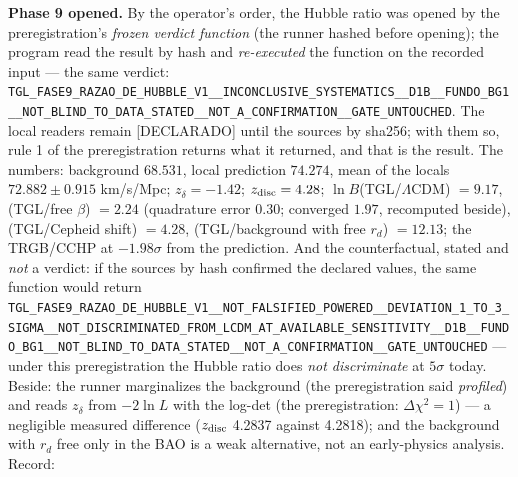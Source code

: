\documentclass[11pt]{article}
\theoremstyle{definition}\newtheorem{deriv}{Derivation}
\begin{document}
\textbf{Phase 9 opened.} By the operator's order, the Hubble ratio was opened by the preregistration's \emph{frozen verdict function} (the runner hashed before opening); the program read the result by hash and \emph{re-executed} the function on the recorded input --- the same verdict: \texttt{TGL\_\allowbreak{}FASE9\_\allowbreak{}RAZAO\_\allowbreak{}DE\_\allowbreak{}HUBBLE\_\allowbreak{}V1\_\allowbreak{}\_\allowbreak{}INCONCLUSIVE\_\allowbreak{}SYSTEMATICS\_\allowbreak{}\_\allowbreak{}D1B\_\allowbreak{}\_\allowbreak{}FUNDO\_\allowbreak{}BG1\_\allowbreak{}\_\allowbreak{}NOT\_\allowbreak{}BLIND\_\allowbreak{}TO\_\allowbreak{}DATA\_\allowbreak{}STATED\_\allowbreak{}\_\allowbreak{}NOT\_\allowbreak{}A\_\allowbreak{}CONFIRMATION\_\allowbreak{}\_\allowbreak{}GATE\_\allowbreak{}UNTOUCHED}. The local readers remain \textsf{[DECLARADO]} until the sources by sha256; with them so, rule 1 of the preregistration returns what it returned, and that is the result. The numbers: background $68.531$, local prediction $74.274$, mean of the locals $72.882\pm0.915$ km/s/Mpc; $z_\delta=-1.42$; $z_{\rm disc}=4.28$; $\ln B$(TGL/$\Lambda$CDM) $=9.17$, (TGL/free $\beta$) $=2.24$ (quadrature error $0.30$; converged $1.97$, recomputed beside), (TGL/Cepheid shift) $=4.28$, (TGL/background with free $r_d$) $=12.13$; the TRGB/CCHP at $-1.98\sigma$ from the prediction. And the counterfactual, stated and \emph{not} a verdict: if the sources by hash confirmed the declared values, the same function would return \texttt{TGL\_\allowbreak{}FASE9\_\allowbreak{}RAZAO\_\allowbreak{}DE\_\allowbreak{}HUBBLE\_\allowbreak{}V1\_\allowbreak{}\_\allowbreak{}NOT\_\allowbreak{}FALSIFIED\_\allowbreak{}POWERED\_\allowbreak{}\_\allowbreak{}DEVIATION\_\allowbreak{}1\_\allowbreak{}TO\_\allowbreak{}3\_\allowbreak{}SIGMA\_\allowbreak{}\_\allowbreak{}NOT\_\allowbreak{}DISCRIMINATED\_\allowbreak{}FROM\_\allowbreak{}LCDM\_\allowbreak{}AT\_\allowbreak{}AVAILABLE\_\allowbreak{}SENSITIVITY\_\allowbreak{}\_\allowbreak{}D1B\_\allowbreak{}\_\allowbreak{}FUNDO\_\allowbreak{}BG1\_\allowbreak{}\_\allowbreak{}NOT\_\allowbreak{}BLIND\_\allowbreak{}TO\_\allowbreak{}DATA\_\allowbreak{}STATED\_\allowbreak{}\_\allowbreak{}NOT\_\allowbreak{}A\_\allowbreak{}CONFIRMATION\_\allowbreak{}\_\allowbreak{}GATE\_\allowbreak{}UNTOUCHED} --- under this preregistration the Hubble ratio does \emph{not discriminate} at $5\sigma$ today. Beside: the runner marginalizes the background (the preregistration said \emph{profiled}) and reads $z_\delta$ from $-2\ln L$ with the log-det (the preregistration: $\Delta\chi^2=1$) --- a negligible measured difference ($z_{\rm disc}$ 4.2837 against 4.2818); and the background with $r_d$ free only in the BAO is a weak alternative, not an early-physics analysis. Record: 
\end{document}
